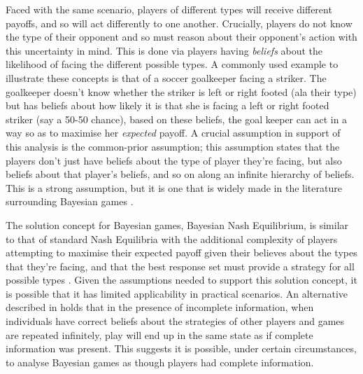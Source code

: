 \documentclass[11pt]{book}
\newcommand*{\np}{\par\noindent\newline}
\begin{document}
\np Faced with the same scenario, players of different types will receive different payoffs, and so will act differently to one another. 
Crucially, players do not know the type of their opponent and so must reason about their opponent's action with this uncertainty in mind. 
This is done via players having \textit{beliefs} about the likelihood of facing the different possible types. 
A commonly used example to illustrate these concepts is that of a soccer goalkeeper facing a striker. 
The goalkeeper doesn't know whether the striker is left or right footed (ala their type) but has beliefs about how likely it is that
she is facing a left or right footed striker (say a 50-50 chance), based on these beliefs, the goal keeper can act in a way so as to maximise her \textit{expected} payoff. 
A crucial assumption in support of this analysis is the common-prior assumption; this assumption states that the players
don't just have beliefs about the type of player they're facing, but also beliefs about that player's beliefs, and so on
along an infinite hierarchy of beliefs. This is a strong assumption, but it is one that is widely made in the literature
surrounding Bayesian games \citep[~p. 164]{shoham_multiagent_2008}. 

\np The solution concept for Bayesian games, Bayesian Nash Equilibrium, 
is similar to that of standard Nash Equilibria with the additional complexity of players attempting to maximise their expected payoff given their believes about the types that they're facing, and that the best response set must provide a strategy for all possible types \citep{shoham_multiagent_2008}. 
Given the assumptions needed to support this solution concept, it is possible that it has limited applicability in practical scenarios. 
An alternative described in \citet{kalai_rational_1993} holds that in the presence of incomplete information, 
when individuals have correct beliefs about the strategies of other players and games are repeated infinitely, 
play will end up in the same state as if complete information was present. 
This suggests it is possible, under certain circumstances, to analyse Bayesian games as though players had complete information.
\end{document}
